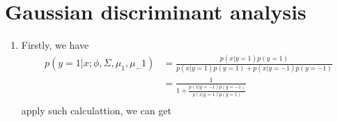 \documentclass[12pt]{article}
\begin{document}
    \section*{Gaussian discriminant analysis   }
    \begin{enumerate}[label=(\alph*)]
    
    \item 
    Firstly, we have
    \begin{equation*} 
        \begin{split}
            p(y=1|x;\phi, \Sigma, \mu_1, \mu_-1)
             &= \frac{p(x|y=1)p(y=1)}{p(x|y=1)p(y=1)+p(x|y=-1)p(y=-1)}  \\
             &= \frac{1}{1+\frac{p(x|y=-1)p(y=-1)}{p(x|y=1)p(y=1)}} \\
        \end{split}
    \end{equation*}                                                                                                                                                                                                                                                                                                                                                                                                                                                                                                                                                                                                                                                                                                                                                                                                                                                                                                                                                                                                                                                                                                                                                                                                                                                                                                                                                                                                                                                                                                                                                                                                                                                                                                                                   
    apply such calculattion, we can get

\end{enumerate}
\end{document}
